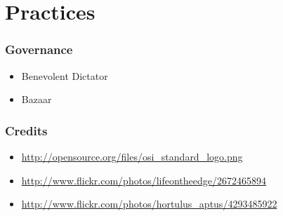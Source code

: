 \documentclass[18pt]{beamer}
\begin{document}
{ %
{}  %
\begin{frame}[plain]
\end{frame}
} %

\section{Practices}

\begin{frame}
\frametitle{Governance}
\begin{itemize}
\item Benevolent Dictator
\pause
\item Bazaar
\end{itemize}
\end{frame}


\begin{frame}
\frametitle{Credits}
\begin{itemize}
\item \url{http://opensource.org/files/osi_standard_logo.png}
\item \url{http://www.flickr.com/photos/lifeontheedge/2672465894}
\item \url{http://www.flickr.com/photos/hortulus_aptus/4293485922}
\end{itemize}
\end{frame}
\end{document}
